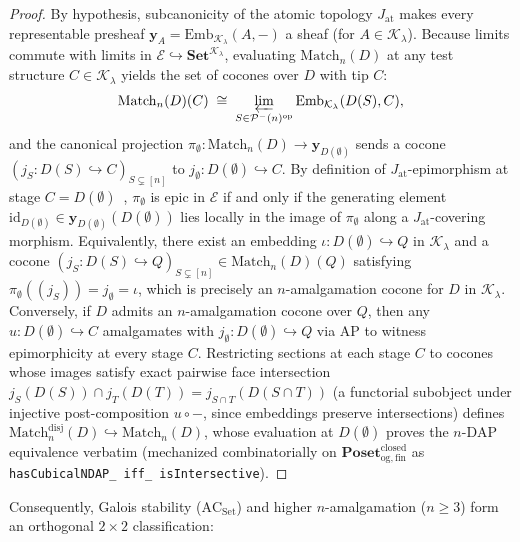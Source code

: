 \begin{proof}
By hypothesis, subcanonicity of the atomic topology $J_{\mathrm{at}}$ makes every representable presheaf $\mathbf{y}_A = \mathrm{Emb}_{\mathcal{K}_\lambda}(A, -)$ a sheaf (for $A \in \mathcal{K}_\lambda$). Because limits commute with limits in $\mathcal{E} \hookrightarrow \mathbf{Set}^{\mathcal{K}_\lambda}$, evaluating $\mathrm{Match}_n(D)$ at any test structure $C \in \mathcal{K}_\lambda$ yields the set of cocones over $D$ with tip $C$:
\[
  \mathrm{Match}_n(D)(C) \;\cong\; \varprojlim_{S \in \mathcal{P}^-(n)^{\mathrm{op}}} \mathrm{Emb}_{\mathcal{K}_\lambda}(D(S), C),
\]
and the canonical projection $\pi_\emptyset : \mathrm{Match}_n(D) \to \mathbf{y}_{D(\emptyset)}$ sends a cocone $(j_S : D(S) \hookrightarrow C)_{S \subsetneq [n]}$ to $j_\emptyset : D(\emptyset) \hookrightarrow C$. By definition of $J_{\mathrm{at}}$-epimorphism at stage $C = D(\emptyset)$~\cite[\S C2.2]{Johnstone02}, $\pi_\emptyset$ is epic in $\mathcal{E}$ if and only if the generating element $\mathrm{id}_{D(\emptyset)} \in \mathbf{y}_{D(\emptyset)}(D(\emptyset))$ lies locally in the image of $\pi_\emptyset$ along a $J_{\mathrm{at}}$-covering morphism. Equivalently, there exist an embedding $\iota : D(\emptyset) \hookrightarrow Q$ in $\mathcal{K}_\lambda$ and a cocone $(j_S : D(S) \hookrightarrow Q)_{S \subsetneq [n]} \in \mathrm{Match}_n(D)(Q)$ satisfying $\pi_\emptyset((j_S)) = j_\emptyset = \iota$, which is precisely an $n$-amalgamation cocone for $D$ in $\mathcal{K}_\lambda$. Conversely, if $D$ admits an $n$-amalgamation cocone over $Q$, then any $u : D(\emptyset) \hookrightarrow C$ amalgamates with $j_\emptyset : D(\emptyset) \hookrightarrow Q$ via $\mathrm{AP}$ to witness epimorphicity at every stage $C$. Restricting sections at each stage $C$ to cocones whose images satisfy exact pairwise face intersection $j_S(D(S)) \cap j_T(D(T)) = j_{S \cap T}(D(S \cap T))$ (a functorial subobject under injective post-composition $u \circ -$, since embeddings preserve intersections) defines $\mathrm{Match}_n^{\mathrm{disj}}(D) \hookrightarrow \mathrm{Match}_n(D)$, whose evaluation at $D(\emptyset)$ proves the $n$-$\mathrm{DAP}$ equivalence verbatim (mechanized combinatorially on $\mathbf{Poset}_{\mathrm{og,fin}}^{\mathrm{closed}}$ as \texttt{hasCubicalNDAP\_ iff\_ isIntersective}).
\end{proof}

Consequently, Galois stability ($\mathrm{AC}_{\mathrm{Set}}$) and higher $n$-amalgamation ($n \ge 3$) form an orthogonal $2 \times 2$ classification:

